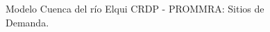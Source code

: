 \documentclass[11pt,]{article}
\begin{document}
\begin{figure}[H]
\begin{center}
\caption{Modelo Cuenca del río Elqui CRDP - PROMMRA: Sitios de Demanda.}
\label{etiqueta_figura10}
\end{center}
\end{figure}
\end{document}
